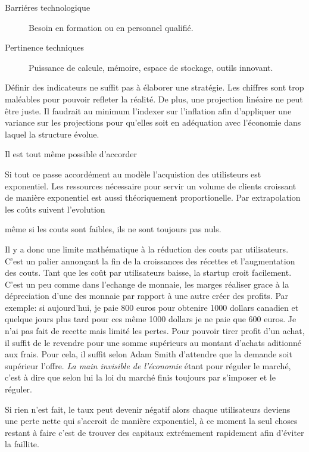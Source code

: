 \documentclass[11pt, a4paper ]{article}
\begin{document}
\begin{spacing}{1.5}
\begin{description}
	\item[Barriéres technologique]
		Besoin en formation ou en personnel qualifié.

	\item[Pertinence techniques]
		Puissance de calcule, mémoire, espace de stockage, outils innovant.

\end{description}

Définir des indicateurs ne suffit pas à élaborer une stratégie. Les chiffres sont trop maléables pour pouvoir refleter la réalité. De plus, une projection linéaire ne peut être juste. Il faudrait au minimum l'indexer sur l'inflation afin d'appliquer une variance sur les projections pour qu'elles soit en adéquation avec l'économie dans laquel la structure évolue.

Il est tout même possible d'accorder 

Si tout ce passe accordément au modèle l'acquistion des utilisteurs est exponentiel. Les ressources nécessaire pour servir un volume de clients croissant de manière exponentiel est aussi théoriquement proportionelle. Par extrapolation les coûts suivent l'evolution


 même si les couts sont faibles, ils ne sont toujours pas nuls. 


Il y a donc une limite mathématique à la réduction des couts par utilisateurs. C'est un palier annonçant la fin de la croissances des récettes et l'augmentation des couts. Tant que les coût par utilisateurs baisse, la startup croit facilement. C'est un peu comme dans l'echange de monnaie, les marges réaliser grace à la dépreciation d'une des monnaie par rapport à une autre créer des profits. 
Par exemple: si aujourd'hui, je paie 800 euros pour obtenire 1000 dollars canadien et quelque jours plus tard pour ces même 1000 dollars je ne paie que 600 euros. Je n'ai pas fait de recette mais limité les pertes. Pour pouvoir tirer profit d'un achat, il suffit de le revendre pour une somme supérieurs au montant d'achats aditionné aux frais. 
Pour cela, il suffit selon Adam Smith d'attendre que la demande soit supérieur l'offre. \emph{La main invisible de l'économie}  étant pour réguler le marché, c'est à dire que selon lui la loi du marché finis toujours par s'imposer et le réguler.

Si rien n'est fait, le taux peut devenir négatif alors chaque utilisateurs deviens une perte nette qui s'accroit de manière exponentiel, à ce moment la seul choses restant à faire c'est de trouver des capitaux extrémement rapidement afin d'éviter la faillite. 


\end{spacing}
\end{document}
